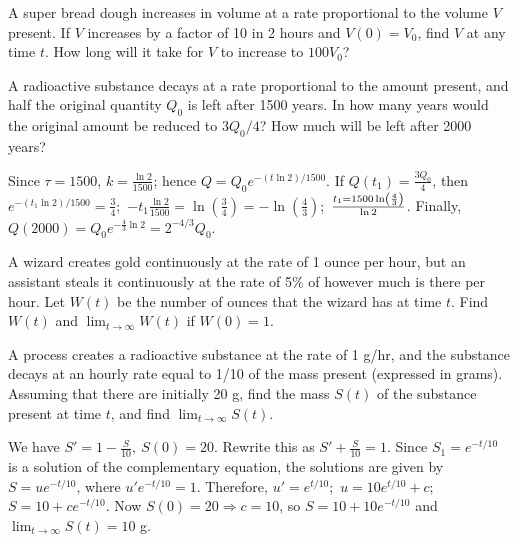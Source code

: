 \documentclass{ximera}
\begin{document}
\begin{problem}\label{exer:4.1.13}
A super bread dough increases in volume at a rate
proportional to the volume $V$ present.  If $V$ increases by
a factor of 10 in 2 hours and $V(0)=V_0$, find $V$ at any
time $t$.  How long will it take for $V$ to increase to $100
V_0$?
\end{problem}

\begin{problem}\label{exer:4.1.14}
A radioactive substance decays at a rate proportional to the
amount present, and half the original quantity $Q_0$ is left
after 1500 years. In how many years would the original
amount be reduced to $3Q_0/4$?  How much will be
left after 2000 years?
\begin{solution}
Since $\tau=1500$, $k=\frac{\ln2}{1500}$; hence
$Q=Q_0e^{-(t\ln2)/1500}$. If $Q(t_1)=\frac{3Q_0}{4}$, then
$e^{-(t_1\ln2)/1500}=\frac{3}{4}$;\,
$-t_1\frac{\ln2}{1500}=\ln\left(\frac{3}{4}\right)=
-\ln\left(\frac{4}{3}\right)$;\,
$t_1=1500\ln\left(\frac{4}{3}\right)\over\ln2$. Finally,
$Q(2000)=Q_0e^{-\frac{4}{3}\ln2}=2^{-4/3}Q_0$.
\end{solution}
\end{problem}

\begin{problem}\label{exer:4.1.15}
A wizard creates gold continuously at the rate of 1 ounce
per hour, but an assistant steals it continuously at the
rate of 5\% of however much  is there per hour.  Let $W(t)$
be the number of ounces that the wizard has at time $t$.
Find $W(t)$ and $\lim_{t\to\infty}W(t)$ if  $W(0)=1$.
\end{problem}

\begin{problem}\label{exer:4.1.16}
A process creates a radioactive substance at the rate of 1
g/hr, and the substance decays at an hourly rate
 equal to 1/10 of the mass present (expressed in
grams).  Assuming that there are initially 20 g, find
the mass $S(t)$ of the substance present at time $t$, and
find $\lim_{t\to\infty} S(t)$.
\begin{solution}
We have $S'=1-\frac{S}{10},\ S(0)=20$. Rewrite this as $S'+\frac{S}{10}=1$. Since
$S_1=e^{-t/10}$ is a solution of the complementary equation, the
solutions are given by $S=ue^{-t/10}$, where $u'e^{-t/10}=1$.
Therefore, $u'=e^{t/10}$;\ $u=10e^{t/10}+c$;\;
$S=10+ce^{-t/10}$. Now $S(0)=20\Rightarrow c=10$, so
$S=10+10e^{-t/10}$ and
 $\lim_{t\to\infty}S(t)=10$ g.
\end{solution}
\end{problem}
\end{document}
